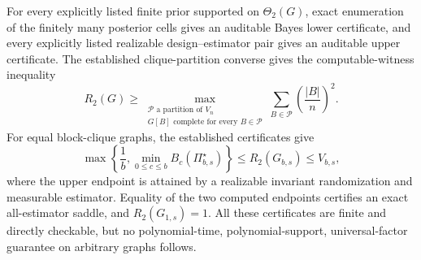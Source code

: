For every explicitly listed finite prior supported on \(\Theta_2(G)\), exact enumeration of the finitely many posterior cells gives an auditable Bayes lower certificate, and every explicitly listed realizable design--estimator pair gives an auditable upper certificate. The established clique-partition converse gives the computable-witness inequality
\[
R_2(G)\geq\max_{\substack{\mathcal P\text{ a partition of }V_n\\G[B]\text{ complete for every }B\in\mathcal P}}\sum_{B\in\mathcal P}\left(\frac{|B|}{n}\right)^2.
\]
For equal block-clique graphs, the established certificates give
\[
\max\left\{\frac1b,\min_{0\leq c\leq b}B_c(\Pi_{b,s}^{\star})\right\}\leq R_2(G_{b,s})\leq V_{b,s},
\]
where the upper endpoint is attained by a realizable invariant randomization and measurable estimator. Equality of the two computed endpoints certifies an exact all-estimator saddle, and \(R_2(G_{1,s})=1\). All these certificates are finite and directly checkable, but no polynomial-time, polynomial-support, universal-factor guarantee on arbitrary graphs follows.